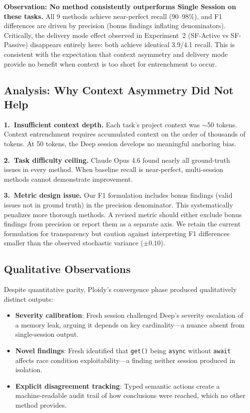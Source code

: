 \documentclass[11pt]{article}
\begin{document}
\textbf{Observation: No method consistently outperforms Single Session on these tasks.} All 9 methods achieve near-perfect recall (90--98\%), and F1 differences are driven by precision (bonus findings inflating denominators). Critically, the delivery mode effect observed in Experiment~2 (SF-Active vs SF-Passive) disappears entirely here: both achieve identical 3.9/4.1 recall. This is consistent with the expectation that context asymmetry and delivery mode provide no benefit when context is too short for entrenchment to occur.

\subsection{Analysis: Why Context Asymmetry Did Not Help}
\label{sec:why-no-help}

\textbf{1.\ Insufficient context depth.} Each task's project context was $\sim$50 tokens. Context entrenchment requires accumulated context on the order of thousands of tokens. At 50 tokens, the Deep session develops no meaningful anchoring bias.

\textbf{2.\ Task difficulty ceiling.} Claude Opus 4.6 found nearly all ground-truth issues in every method. When baseline recall is near-perfect, multi-session methods cannot demonstrate improvement.

\textbf{3.\ Metric design issue.} Our F1 formulation includes bonus findings (valid issues not in ground truth) in the precision denominator. This systematically penalizes more thorough methods. A revised metric should either exclude bonus findings from precision or report them as a separate axis. We retain the current formulation for transparency but caution against interpreting F1 differences smaller than the observed stochastic variance ($\pm 0.10$).

\subsection{Qualitative Observations}
\label{sec:qualitative}

Despite quantitative parity, Ploidy's convergence phase produced qualitatively distinct outputs:

\begin{itemize}[leftmargin=1.5em]
  \item \textbf{Severity calibration}: Fresh session challenged Deep's severity escalation of a memory leak, arguing it depends on key cardinality---a nuance absent from single-session output.
  \item \textbf{Novel findings}: Fresh identified that \texttt{get()} being \texttt{async} without \texttt{await} affects race condition exploitability---a finding neither session produced in isolation.
  \item \textbf{Explicit disagreement tracking}: Typed semantic actions create a machine-readable audit trail of how conclusions were reached, which no other method provides.
\end{itemize}
\end{document}
